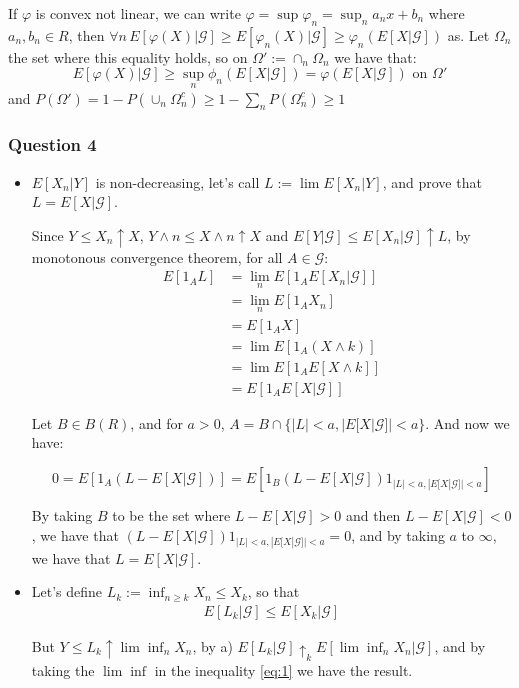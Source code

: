\documentclass[12pt]{article}
\newcommand{\Q}[1]{\subsubsection*{Question #1}}
\begin{document}
\begin{enumerate}
If $\varphi$ is convex not linear, we can write $\varphi = \sup \varphi_n = \sup_n a_n x + b_n$ where $a_n, b_n \in R$, then $\forall n \, E[\varphi(X) | \mathcal G] \ge E[\varphi_n(X)|\mathcal G] \ge \varphi_n(E[X|\mathcal G])$ as.
Let $\Omega_n$ the set where this equality holds, so on $\Omega' := \cap_n \Omega_n$ we have that:
 $$ E[\varphi(X) | \mathcal G] \ge \sup_n \phi_n(E[X|\mathcal G]) = \varphi(E[X|\mathcal G]) \text{ on } \Omega'$$
and $P(\Omega') = 1 - P(\cup_n \Omega_n^c) \ge 1 - \sum_n P(\Omega_n^c) \ge 1$

\end{enumerate}

\Q{4}

\begin{itemize}
\item 

$E[X_n|Y]$ is non-decreasing, let's call $L := \lim E[X_n|Y]$, and prove that $L = E[X|\mathcal G]$.

Since $Y \le X_n \uparrow X$, $Y\wedge n \le X \wedge n\uparrow X $  and $E[Y|\mathcal G] \le E[X_n|\mathcal G] \uparrow L$, by monotonous convergence theorem, for all $A \in \mathcal G$:
\begin{align*}
E[1_A L] &= \lim_n E[1_A  E[X_n|\mathcal G]] \\&= \lim_n E[1_A X_n] \\&= E[1_A X] \\&= \lim E[1_A (X \wedge k) ] \\&= \lim E[1_A E[X \wedge k]] \\&= E[1_A E[X|\mathcal G]]
\end{align*}

Let $B \in B(R)$, and for $a > 0$, $A = B \cap \{ |L| < a, |E[X|\mathcal G]| < a \}$. And now we have:

$$0 = E[1_A (L - E[X|\mathcal G])] = E[1_B (L - E[X|\mathcal G])1_{|L| < a, |E[X|\mathcal G]| < a}]$$

By taking $B$ to be the set where $L - E[X|\mathcal G] > 0$ and then $L - E[X|\mathcal G] < 0$, we have that $(L - E[X|\mathcal G])1_{|L| < a, |E[X|\mathcal G]| < a} = 0$, and by taking $a$ to $\infty$, we have that $L = E[X|\mathcal G]$.

\item
Let's define $L_k := \inf_{n \ge k} X_n \le X_k$, so that 
\begin{align}\label{eq:1}
E[L_k|\mathcal G]  \le E[X_k|\mathcal G]
\end{align}

But $Y \le L_k \uparrow \lim \inf_n X_n$, by a) $E[L_k|\mathcal G] \uparrow_k E[\lim \inf_n X_n|\mathcal G]$, and by taking the $\lim\inf$ in the inequality \ref{eq:1} we have the result.


\end{itemize}
\end{document}
